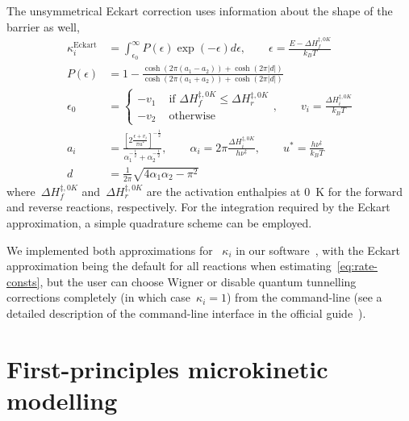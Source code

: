 The unsymmetrical Eckart correction uses information about the shape of the barrier as well,
% 
\begin{equation}
	\begin{split}
		\kappa_i^\text{Eckart}
		&= \int_{\epsilon_0}^\infty
		P(\epsilon) \exp \left(
		-\epsilon
		\right) d \epsilon,
		\qquad
		\epsilon
		= \frac{E - \Delta H^{\ddagger,
					0 K}_f}{k_B T} \\
		P(\epsilon)
		&= 1
		- \frac{
			\cosh \left(
			2 \pi (a_1 - a_2)
			\right)
			+ \cosh \left(
			2 \pi |d|
			\right)
		}{
			\cosh \left(
			2 \pi (a_1 + a_2)
			\right)
			+ \cosh \left(
			2 \pi |d|
			\right)
		} \\
		\epsilon_0 &= \begin{cases}
			-v_1 & \text{ if }
			\Delta H^{\ddagger,
					0 K}_f \le \Delta H^{\ddagger,
			0 K}_r                   \\
			-v_2 & \text{ otherwise}
		\end{cases},
		\qquad
		v_i
		= \frac{\Delta H^{\ddagger,
					0 K}_i}{k_B T} \\
		a_i
		&= \frac{
			\left[
				2
				\frac{
					\epsilon + v_i
				}{\pi u^*}
				\right]^{-\frac{1}{2}}
		}{
			\alpha_1^{-\frac{1}{2}}
			+ \alpha_2^{-\frac{1}{2}}
		},
		\qquad
		\alpha_i
		= 2 \pi \frac{
			\Delta H^{\ddagger,
					0 K}_i
		}{
			h \nu^\ddagger
		},
		\qquad
		u^*
		= \frac{
			h \nu^\ddagger
		}{
			k_B T
		} \\
		d
		&= \frac{1}{2 \pi}
		\sqrt{
			4 \alpha_1 \alpha_2 - \pi^2
		}
	\end{split}
\end{equation}
% 
where~$\Delta H^{\ddagger,
			0 K}_f$ and~$\Delta H^{\ddagger,
			0 K}_r$ are the activation enthalpies at 0~K for the forward and reverse reactions,
respectively.
For the integration required by the Eckart approximation,
a simple quadrature scheme can be employed.

We implemented both approximations for ~$\kappa_i$ in our software~\overreact{},
with the Eckart approximation being the default for all reactions when estimating~\cref{eq:rate-consts},
but the user can choose Wigner or disable quantum tunnelling corrections completely (in which case~$\kappa_i = 1$)
from the command-line (see a detailed description of the command-line interface in the official guide~\cite{overreactguidecli2022}).

\section{First-principles microkinetic modelling}%
\label{sec:microkinetic}

